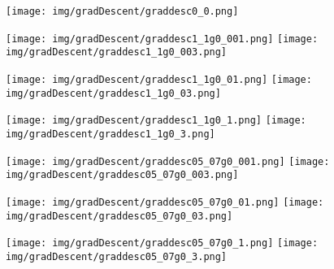 \documentclass{article}
\begin{document}
\begin{figure}[H]
    \centering
    \texttt{[image: img/gradDescent/graddesc0\_0.png]}
\end{figure}
\begin{figure}[H]
    \texttt{[image: img/gradDescent/graddesc1\_1g0\_001.png]}
    \texttt{[image: img/gradDescent/graddesc1\_1g0\_003.png]}
\end{figure}
\begin{figure}[H]
    \texttt{[image: img/gradDescent/graddesc1\_1g0\_01.png]}
    \texttt{[image: img/gradDescent/graddesc1\_1g0\_03.png]}
\end{figure}
\begin{figure}[H]
    \texttt{[image: img/gradDescent/graddesc1\_1g0\_1.png]}
    \texttt{[image: img/gradDescent/graddesc1\_1g0\_3.png]}
\end{figure}
\begin{figure}[H]
    \texttt{[image: img/gradDescent/graddesc05\_07g0\_001.png]}
    \texttt{[image: img/gradDescent/graddesc05\_07g0\_003.png]}
\end{figure}
\begin{figure}[H]
    \texttt{[image: img/gradDescent/graddesc05\_07g0\_01.png]}
    \texttt{[image: img/gradDescent/graddesc05\_07g0\_03.png]}
\end{figure}
\begin{figure}[H]
    \texttt{[image: img/gradDescent/graddesc05\_07g0\_1.png]}
    \texttt{[image: img/gradDescent/graddesc05\_07g0\_3.png]}
\end{figure}
\end{document}
